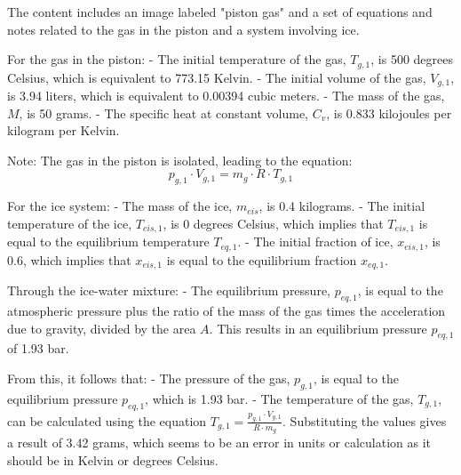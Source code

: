 The content includes an image labeled "piston gas" and a set of equations and notes related to the gas in the piston and a system involving ice.

For the gas in the piston:
- The initial temperature of the gas, \( T_{g,1} \), is 500 degrees Celsius, which is equivalent to 773.15 Kelvin.
- The initial volume of the gas, \( V_{g,1} \), is 3.94 liters, which is equivalent to 0.00394 cubic meters.
- The mass of the gas, \( M \), is 50 grams.
- The specific heat at constant volume, \( C_v \), is 0.833 kilojoules per kilogram per Kelvin.

Note: The gas in the piston is isolated, leading to the equation:
\[ p_{g,1} \cdot V_{g,1} = m_g \cdot R \cdot T_{g,1} \]

For the ice system:
- The mass of the ice, \( m_{eis} \), is 0.4 kilograms.
- The initial temperature of the ice, \( T_{eis,1} \), is 0 degrees Celsius, which implies that \( T_{eis,1} \) is equal to the equilibrium temperature \( T_{eq,1} \).
- The initial fraction of ice, \( x_{eis,1} \), is 0.6, which implies that \( x_{eis,1} \) is equal to the equilibrium fraction \( x_{eq,1} \).

Through the ice-water mixture:
- The equilibrium pressure, \( p_{eq,1} \), is equal to the atmospheric pressure plus the ratio of the mass of the gas times the acceleration due to gravity, divided by the area \( A \). This results in an equilibrium pressure \( p_{eq,1} \) of 1.93 bar.

From this, it follows that:
- The pressure of the gas, \( p_{g,1} \), is equal to the equilibrium pressure \( p_{eq,1} \), which is 1.93 bar.
- The temperature of the gas, \( T_{g,1} \), can be calculated using the equation \( T_{g,1} = \frac{p_{g,1} \cdot V_{g,1}}{R \cdot m_g} \). Substituting the values gives a result of 3.42 grams, which seems to be an error in units or calculation as it should be in Kelvin or degrees Celsius.